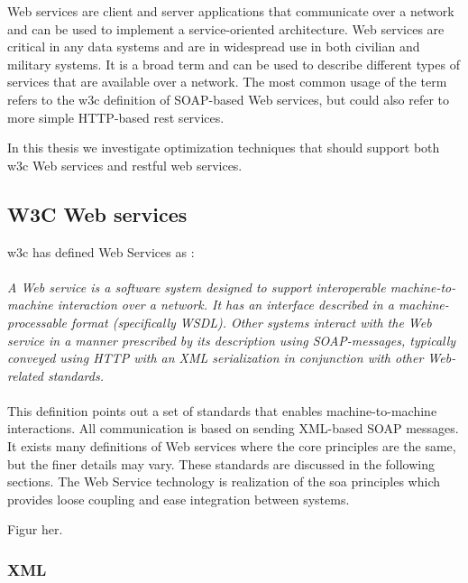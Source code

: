 Web services are client and server applications that communicate over a
network and can be used to implement a service-oriented architecture. Web
services are critical in any data systems and are in widespread use in both
civilian and military systems. It is a broad term and can be used to describe
different types of services that are available over a network. The most common
usage of the term refers to the \gls{w3c} definition of SOAP-based Web
services, but could also refer to more simple HTTP-based \gls{rest} services.

In this thesis we investigate optimization techniques that should support both
\gls{w3c} Web services and \gls{rest}ful web services.

\subsection{W3C Web services}

\gls{w3c} has defined Web Services as \cite{wrc-web-service}:

\paragraph{}
\textit{
    A Web service is a software system designed to support interoperable
    machine-to-machine interaction over a network. It has an interface described in
    a machine-processable format (specifically WSDL). Other systems interact with
    the Web service in a manner prescribed by its description using SOAP-messages,
    typically conveyed using HTTP with an XML serialization in conjunction with
    other Web-related standards.
}

\paragraph{}

This definition points out a set of standards that enables machine-to-machine
interactions. All communication is based on sending XML-based SOAP messages.
It exists many definitions of Web services where the core principles are the
same, but the finer details may vary.  These standards are discussed in the
following sections. The Web Service technology is realization of the \gls{soa}
principles which provides loose coupling and ease integration between systems.

Figur her.


\subsubsection{XML}

